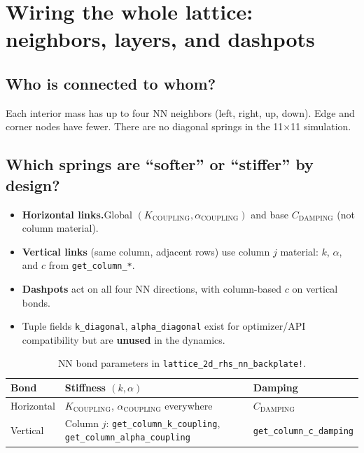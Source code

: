 \documentclass[11pt,a4paper]{article}
\begin{document}
\section{Wiring the whole lattice: neighbors, layers, and dashpots}

\subsection{Who is connected to whom?}
Each interior mass has up to four NN neighbors (left, right, up, down). Edge and corner nodes have fewer. There are no diagonal springs in the 11×11 simulation.

\subsection{Which springs are ``softer'' or ``stiffer'' by design?}
\begin{itemize}
  \item \textbf{Horizontal links.}\enspace Global $(K_{\text{COUPLING}},\alpha_{\text{COUPLING}})$ and base $C_{\text{DAMPING}}$ (not column material).
  \item \textbf{Vertical links} (same column, adjacent rows) use column $j$ material: $k$, $\alpha$, and $c$ from \texttt{get\_column\_*}.
  \item \textbf{Dashpots} act on all four NN directions, with column-based $c$ on vertical bonds.
  \item Tuple fields \texttt{k\_diagonal}, \texttt{alpha\_diagonal} exist for optimizer/API compatibility but are \textbf{unused} in the dynamics.
\end{itemize}

\begin{table}[htbp]
\centering
\small
\begin{tabular}{@{}p{}p{}p{}@{}}
\toprule
\textbf{Bond} & \textbf{Stiffness $(k,\alpha)$} & \textbf{Damping} \\
\midrule
Horizontal & $K_{\text{COUPLING}}$, $\alpha_{\text{COUPLING}}$ everywhere & $C_{\text{DAMPING}}$ \\
Vertical & Column $j$: \texttt{get\_column\_k\_coupling}, \texttt{get\_column\_alpha\_coupling} & \texttt{get\_column\_c\_damping} \\
\bottomrule
\end{tabular}
\caption{NN bond parameters in \texttt{lattice\_2d\_rhs\_nn\_backplate!}.}
\label{tab:routing}
\end{table}
\end{document}
